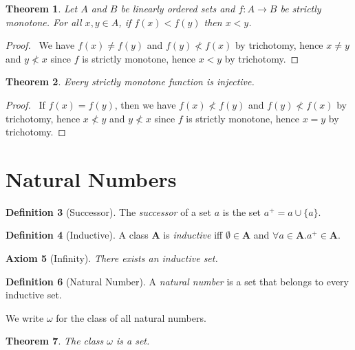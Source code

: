 \documentclass{article}
\let\qed\relax
\newtheorem{axiom}{Axiom}
\newtheorem{theorem}[axiom]{Theorem}
\theoremstyle{definition}
\newtheorem{definition}[axiom]{Definition}
\begin{document}
    \begin{theorem}
        Let $A$ and $B$ be linearly ordered sets and $f : A \rightarrow B$ be strictly monotone.
        For all $x, y \in A$, if $f(x) < f(y)$ then $x < y$.
    \end{theorem}

    \begin{proof}
        \pf\ We have $f(x) \neq f(y)$ and $f(y) \not < f(x)$ by trichotomy, hence $x \neq y$ and $y \not < x$
        since $f$ is strictly monotone, hence $x < y$ by trichotomy. \qed
    \end{proof}

    \begin{theorem}
        Every strictly monotone function is injective.
    \end{theorem}

    \begin{proof}
        \pf\ If $f(x) = f(y)$, then we have $f(x) \not < f(y)$ and $f(y) \not < f(x)$ by trichotomy,
        hence $x \not < y$ and $y \not < x$ since $f$ is strictly monotone, hence $x = y$ by
        trichotomy. \qed
    \end{proof}
    \section{Natural Numbers}

    \begin{definition}[Successor]
        The \emph{successor} of a set $a$ is the set $a^+ = a \cup \{ a \}$.
    \end{definition}

    \begin{definition}[Inductive]
        A class $\mathbf{A}$ is \emph{inductive} iff $\emptyset \in \mathbf{A}$ and
        $\forall a \in \mathbf{A}. a^+ \in \mathbf{A}$.
    \end{definition}

    \begin{axiom}[Infinity]
        There exists an inductive set.
    \end{axiom}

    \begin{definition}[Natural Number]
        A \emph{natural number} is a set that belongs to every inductive set.

        We write $\omega$ for the class of all natural numbers.
    \end{definition}

    \begin{theorem}
        The class $\omega$ is a set.
    \end{theorem}
\end{document}
